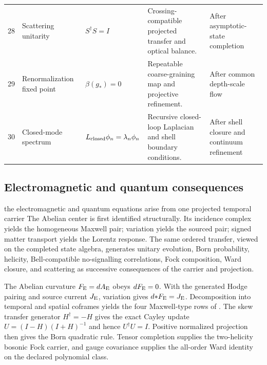 \documentclass[11pt]{article}
\numberwithin{equation}{section}
\theoremstyle{remark}
\begin{document}
\begin{landscape}
\begin{longtable}{p{0.65cm}p{3.5cm}p{5.2cm}p{6.2cm}p{3.4cm}}
28&Scattering unitarity&$S^\dagger S=I$&Crossing-compatible projected transfer and optical balance.&After asymptotic-state completion\\
29&Renormalization fixed point&$\beta(g_*)=0$&Repeatable coarse-graining map and projective refinement.&After common depth-scale flow\\
30&Closed-mode spectrum&$L_{\rm closed}\phi_n=\lambda_n\phi_n$&Recursive closed-loop Laplacian and shell boundary conditions.&After shell closure and continuum refinement\\
\bottomrule
\end{longtable}
\end{landscape}

\subsection{Electromagnetic and quantum consequences}
\begin{conceptledger}{the electromagnetic and quantum equations arise from one projected temporal carrier}
The Abelian center is first identified structurally. Its incidence complex yields the homogeneous Maxwell pair; variation yields the sourced pair; signed matter transport yields the Lorentz response. The same ordered transfer, viewed on the completed state algebra, generates unitary evolution, Born probability, helicity, Bell-compatible no-signalling correlations, Fock composition, Ward closure, and scattering as successive consequences of the carrier and projection.
\end{conceptledger}
The Abelian curvature $F_{\rm E}=dA_{\rm E}$ obeys $dF_{\rm E}=0$. With the generated Hodge pairing and source current $J_{\rm E}$, variation gives $d{*F_{\rm E}}=J_{\rm E}$. Decomposition into temporal and spatial coframes yields the four Maxwell-type rows of . The skew transfer generator $H^\dagger=-H$ gives the exact Cayley update $U=(I-H)(I+H)^{-1}$ and hence $U^\dagger U=I$. Positive normalized projection then gives the Born quadratic rule. Tensor completion supplies the two-helicity bosonic Fock carrier, and gauge covariance supplies the all-order Ward identity on the declared polynomial class.
\end{document}
